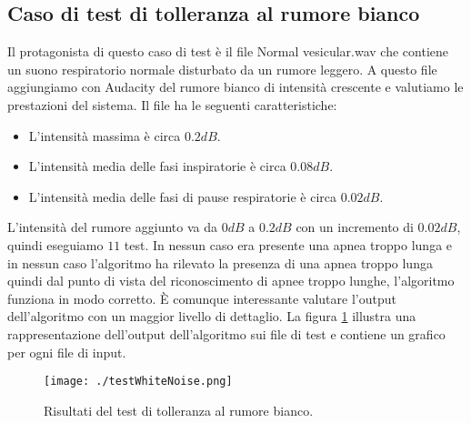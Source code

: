 \subsection{Caso di test di tolleranza al rumore bianco}
Il protagonista di questo caso di test \`e il file Normal vesicular.wav che contiene un suono respiratorio normale disturbato da un rumore leggero. A questo file aggiungiamo con Audacity del rumore bianco di intensit\`a crescente e valutiamo le prestazioni del sistema. Il file ha le seguenti caratteristiche:
\begin{itemize}
 \item 
    L'intensit\`a massima \`e circa $0.2dB$.
  \item
    L'intensit\`a media delle fasi inspiratorie \`e circa $0.08dB$.
  \item
    L'intensit\`a media delle fasi di pause respiratorie \`e circa $0.02dB$.
%     
% 
\end{itemize}

L'intensit\`a del rumore aggiunto va da $0dB$ a $0.2dB$ con un incremento di $0.02dB$, quindi eseguiamo $11$ test. 
In nessun caso era presente una apnea troppo lunga e in nessun caso l'algoritmo ha rilevato la presenza di una apnea troppo lunga quindi dal punto di vista del riconoscimento di apnee troppo lunghe, l'algoritmo funziona in modo corretto. 
\`E comunque interessante valutare l'output dell'algoritmo con un maggior livello di dettaglio. 
La figura \ref{testNormalWhiteNoise} illustra una rappresentazione dell'output dell'algoritmo sui file di test e contiene un grafico per ogni file di input.
\begin{figure}
 \centering
 \texttt{[image: ./testWhiteNoise.png]}
  \caption{Risultati del test di tolleranza al rumore bianco.}
  \label{testNormalWhiteNoise}
\end{figure}

